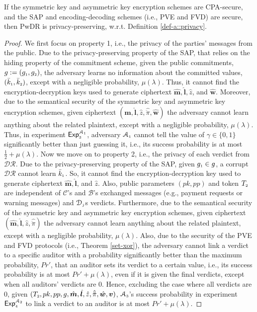 \vspace{-2mm}
\begin{lemma}\label{lemma::privacy}
If the symmetric key and asymmetric key encryption schemes are CPA-secure, and the SAP and encoding-decoding schemes (i.e., PVE and FVD)  are secure, then PwDR is privacy-preserving, w.r.t.  Definition \ref{def-a::privacy}.  
\end{lemma}

% 
\vspace{-4mm}
\begin{proof}
We first focus on property 1, i.e., the privacy of the parties' messages from the public.  Due to the privacy-preserving property of the SAP, that relies  on the hiding property of the commitment scheme, given the public commitments, $g:=(g_{\scriptscriptstyle 1}, g_{\scriptscriptstyle 2})$,  the adversary learns no information about the
committed values, $(\bar k_{\scriptscriptstyle 1}, \bar k_{\scriptscriptstyle 2})$, except with a negligible probability, $\mu(\lambda)$. Thus, it cannot find the encryption-decryption keys used to generate ciphertext  $\hat {\bm m}, \hat{\bm l}, \hat z$, and  $\hat{\bm{w}}$. Moreover, due to the semantical security of the symmetric key and asymmetric key encryption schemes,  given ciphertext $(\hat {\bm m}, \hat{\bm l}, \hat z, \hat{\ddot \pi}, \hat{\bm{w}})$ the adversary cannot learn anything  about the related plaintext, except with a negligible probability, $\mu(\lambda)$. Thus, in experiment  $\mathsf{Exp}_{\scriptscriptstyle 3}^{\mathcal{A}_{\scriptscriptstyle 1}}$,  adversary $\mathcal{A}_{\scriptscriptstyle 1}$ cannot tell the value of $\gamma\in \{0, 1\}$ significantly better than just guessing it, i.e., its success probability is at most $\frac{1}{2}+\mu(\lambda)$. Now we move on to property 2, i.e., the privacy of each verdict from $\mathcal{DR}$. Due to the privacy-preserving property of the SAP, given $g_{\scriptscriptstyle 1}\in g$, a corrupt $\mathcal{DR}$ cannot learn  $\bar k_{\scriptscriptstyle 1}$. So,  it cannot find the encryption-decryption key used to generate ciphertext  $\hat {\bm m}, \hat{\bm l}$, and $\hat z$. Also, public parameters $(pk,pp)$ and token $T_{\scriptscriptstyle 2}$ are independent of $\mathcal{C}$'s and $\mathcal{B}$'s exchanged messages (e.g., payment requests or warning messages)  and $\mathcal{D}_{\scriptscriptstyle j}$s  verdicts. Furthermore, due to  the semantical security of the symmetric key and asymmetric key encryption schemes,  given ciphertext $(\hat {\bm m}, \hat{\bm l}, \hat z, \hat{\ddot \pi})$ the adversary cannot learn anything  about the related plaintext, except with a negligible probability, $\mu(\lambda)$. Also, due to the security of the  PVE and FVD protocols (i.e., Theorem \ref{set-xor}), the adversary cannot link a verdict to a specific auditor with a probability significantly better than the maximum probability, $Pr'$, that an auditor sets its verdict to a certain value, i.e., its success probability is at most $Pr'+\mu(\lambda)$, even if it is given the final verdicts, except when all auditors' verdicts are $0$. Hence, excluding the case where  all verdicts are $0$, given $(T_{\scriptscriptstyle 2}, pk, pp, g, \hat{\bm m}, \hat{\bm l},  \hat z, \hat{\ddot \pi}, \hat{\bm{w}}, \bm v)$,   $\mathcal{A}_{\scriptscriptstyle 3}$'s success probability in experiment $\mathsf{Exp}_{\scriptscriptstyle 4}^{\mathcal{A}_{\scriptscriptstyle 2}}$ to link a verdict to an auditor is at most $Pr'+\mu(\lambda)$. 

\end{proof}
